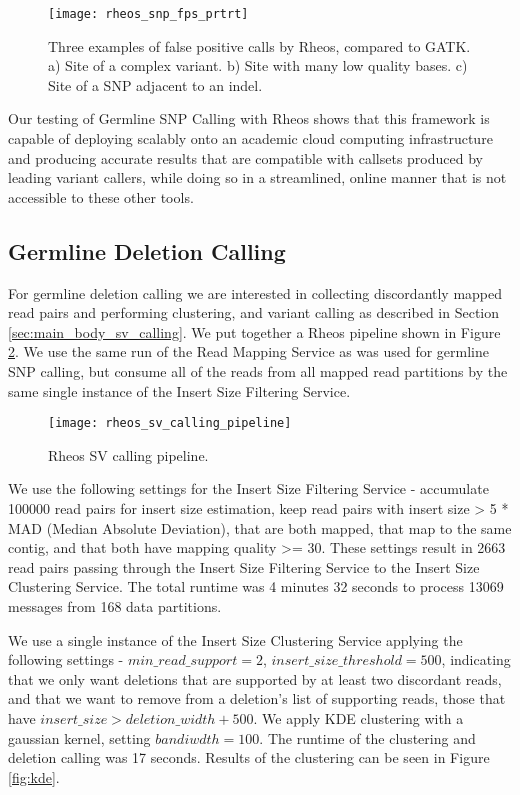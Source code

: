\begin{figure}[h!]
    \texttt{[image: rheos\_snp\_fps\_prtrt]}
    \centering
    \caption {Three examples of false positive calls by Rheos, compared to GATK. a) Site of a complex variant. b) Site with many low quality bases. c) Site of a SNP adjacent to an indel.}
    \label{fig:rheos_snp_fps}
\end{figure}

Our testing of Germline SNP Calling with Rheos shows that this framework is capable of deploying scalably onto an academic cloud computing infrastructure and producing accurate results that are compatible with callsets produced by leading variant callers, while doing so in a streamlined, online manner that is not accessible to these other tools.

\subsection{Germline Deletion Calling}

For germline deletion calling we are interested in collecting discordantly mapped read pairs and performing clustering, and variant calling as described in Section \ref{sec:main_body_sv_calling}. We put together a Rheos pipeline shown in Figure \ref{fig:rheos_sv_calling_pipeline}. We use the same run of the Read Mapping Service as was used for germline SNP calling, but consume all of the reads from all mapped read partitions by the same single instance of the Insert Size Filtering Service.

\begin{figure}[h!]
    \texttt{[image: rheos\_sv\_calling\_pipeline]}
    \centering
    \caption {Rheos SV calling pipeline.}
    \label{fig:rheos_sv_calling_pipeline}
\end{figure}

We use the following settings for the Insert Size Filtering Service - accumulate 100000 read pairs for insert size estimation, keep read pairs with insert size > 5 * MAD (Median Absolute Deviation), that are both mapped, that map to the same contig, and that both have mapping quality >= 30. These settings result in 2663 read pairs passing through the Insert Size Filtering Service to the Insert Size Clustering Service. The total runtime was 4 minutes 32 seconds to process 13069 messages from 168 data partitions.

We use a single instance of the Insert Size Clustering Service applying the following settings - $min\_read\_support = 2$, $insert\_size\_threshold = 500$, indicating that we only want deletions that are supported by at least two discordant reads, and that we want to remove from a deletion's list of supporting reads, those that have $insert\_size > deletion\_width + 500$. We apply KDE clustering with a gaussian kernel, setting $bandiwdth = 100$. The runtime of the clustering and deletion calling was 17 seconds. Results of the clustering can be seen in Figure \ref{fig:kde}.

